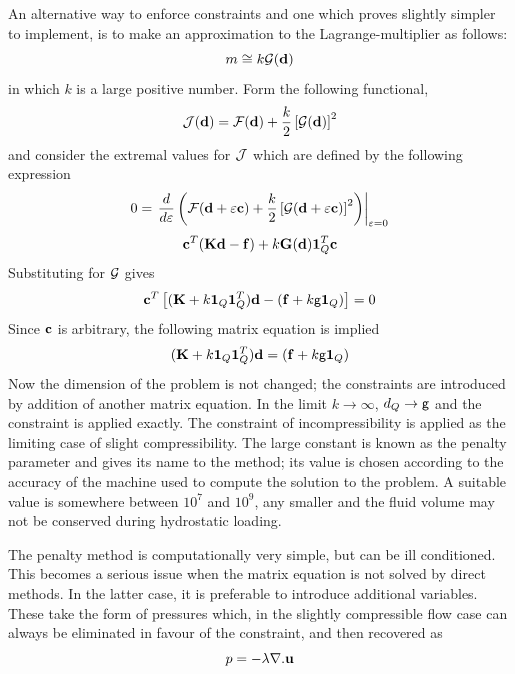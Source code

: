 \documentclass[10pt]{article}
\newcommand{\curly}{\sf }
\begin{document}
An alternative way to enforce constraints and one which proves slightly simpler to implement, is to make an
approximation to the Lagrange-multiplier as follows:
	\begin{equation}
		m \cong k {\cal G}({\bf d})
	\end{equation}
in which $k$ is a large positive number. Form the following functional,
	\begin{equation}
		{\cal J}({\bf d}) = {\cal F}({\bf d}) + \frac{k}{2} \left[{\cal G} ({\bf d})\right]^2 
	\end{equation}
and consider the extremal values for $\cal J$ which are defined by the following expression
	\begin{equation}
		0 = \left. \frac{d}{d\varepsilon} \left( {\cal F}({\bf d}+\varepsilon {\bf c} )+
		\frac{k}{2} \left[ {\cal G} ({\bf d} + \varepsilon{\bf c}) \right]^2 \right) \right| _{\varepsilon = 0}
	\end{equation}
	\begin{equation}
		{\bf c}^T({\bf Kd - f}) + k {\bf G}({\bf d}) {\bf 1}_Q^T {\bf c}
	\end{equation}
Substituting for $\cal G$ gives
	\begin{equation}
		{\bf c}^T \left[ ({\bf K} + k{\bf 1}_Q{\bf 1}_Q^T){\bf d} - ({\bf f} + k \mbox{\curly g} {\bf 1}_Q) \right] = 0
	\end{equation}
Since $\bf c$ is arbitrary, the following matrix equation is implied
	\begin{equation}
		({\bf K} + k{\bf 1}_Q{\bf 1}_Q^T){\bf d} = ({\bf f} + k \mbox{\curly g} {\bf 1}_Q)
	\end{equation}
Now the dimension of the problem is not changed; the constraints are introduced by addition of another matrix equation.
In the limit $k \rightarrow \infty$, $d_Q \rightarrow \mbox{\curly g}$ and the constraint is applied exactly.
The constraint of incompressibility is applied as the limiting case of slight compressibility. The large constant is
known as the penalty parameter and gives its name to the method; its value is chosen according to the accuracy
of the machine used to compute the solution to the problem. A suitable value is somewhere between $10^7$ and $10^9$,
any smaller and the fluid volume may not be conserved during hydrostatic loading.

The penalty method is computationally very simple, but can be ill conditioned.
This becomes a serious issue when the matrix equation is not solved by direct methods. 
In the latter case, it is preferable to introduce additional variables. These take 
the form of pressures which, in the slightly compressible flow case can always
be eliminated in favour of the constraint, and then recovered as
	\begin{equation}
	p = - \lambda \nabla . {\bf u}
	\end{equation}
\end{document}
